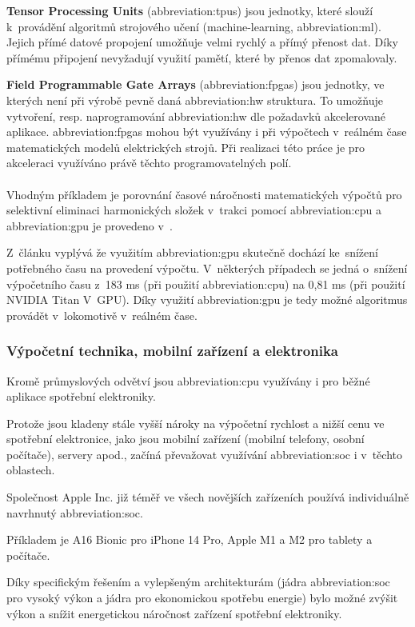 \documentclass[a4paper, twoside, 11pt]{article}
\begin{document}
		\textbf{Tensor Processing Units} (\gls{abbreviation:tpus}) jsou jednotky, které slouží k~provádění algoritmů strojového učení (machine-learning, \gls{abbreviation:ml}). Jejich přímé datové propojení umožňuje velmi rychlý a přímý přenost dat. Díky přímému připojení nevyžadují využití pamětí, které by přenos dat zpomalovaly. \cite{xilinx-accelerated-computing}\par
		\textbf{Field Programmable Gate Arrays} (\gls{abbreviation:fpgas}) jsou jednotky, ve kterých není při výrobě pevně daná \gls{abbreviation:hw} struktura. To umožňuje vytvoření, resp. naprogramování \gls{abbreviation:hw} dle požadavků akcelerované aplikace. \gls{abbreviation:fpgas} mohou být využívány i při výpočtech v~reálném čase matematických modelů elektrických strojů. Při realizaci této práce je pro akceleraci využíváno právě těchto programovatelných polí.\\ \\
		\noindent Vhodným příkladem je porovnání časové náročnosti matematických výpočtů pro selektivní eliminaci harmonických složek v~trakci pomocí \gls{abbreviation:cpu} a \gls{abbreviation:gpu} je provedeno v~\cite{ieee-selective-harmonic-elimination-nvidia}.\par
		Z~článku vyplývá že využitím \gls{abbreviation:gpu} skutečně dochází ke~snížení potřebného času na provedení výpočtu. V~některých případech se jedná o~snížení výpočetního času z~183 ms (při použití \gls{abbreviation:cpu}) na 0,81 ms (při použití NVIDIA Titan V~GPU). Díky využití \gls{abbreviation:gpu} je tedy možné algoritmus provádět v~lokomotivě v~reálném čase.

	\subsubsection{Výpočetní technika, mobilní zařízení a elektronika}
	Kromě průmyslových odvětví jsou \gls{abbreviation:cpu} využívány i pro běžné aplikace spotřební elektroniky.\par
	Protože jsou kladeny stále vyšší nároky na výpočetní rychlost a nižší cenu ve spotřební elektronice, jako jsou mobilní zařízení (mobilní telefony, osobní počítače), servery apod., začíná převažovat využívání \gls{abbreviation:soc} i v~těchto oblastech.\par
	Společnost Apple Inc. již téměř ve všech novějších zařízeních používá individuálně navrhnutý \gls{abbreviation:soc}.\par
	Příkladem je A16 Bionic pro iPhone 14 Pro, Apple M1 a M2 pro tablety a počítače.\par
	Díky specifickým řešením a vylepšeným architekturám (jádra \gls{abbreviation:soc} pro vysoký výkon a jádra pro ekonomickou spotřebu energie) bylo možné zvýšit výkon a snížit energetickou náročnost zařízení spotřební elektroniky. \cite{apple-explore-the-new-architecture-of-apple-silicon-macs}
\end{document}
